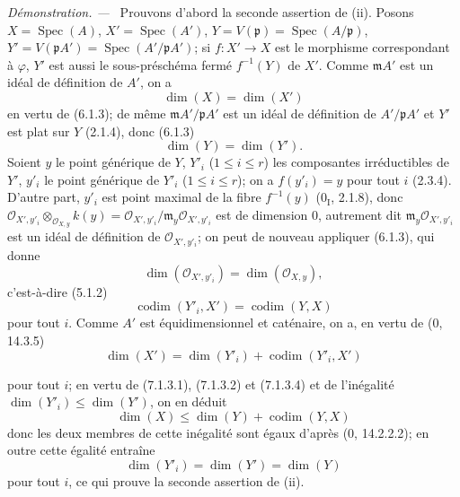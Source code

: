 \documentclass[10pt,oneside]{book}
\newcommand{\oldpage}[2][]{%
  \setcounter{footnote}{0}%
  \marginpar{\scriptsize\textbf{#1}~|~#2}\ignorespaces}
\newenvironment{proof}{%
  \par\medskip\noindent\textit{Démonstration. ---\ }}{\par}
\begin{document}
\begin{proof}
Prouvons d'abord la seconde assertion de (ii). Posons
$X=\operatorname{Spec}(A)$, $X'=\operatorname{Spec}(A')$,
$Y=V(\mathfrak p)=\operatorname{Spec}(A/\mathfrak p)$,
$Y'=V(\mathfrak pA')=\operatorname{Spec}(A'/\mathfrak pA')$; si
$f:X'\to X$ est le morphisme correspondant à $\varphi$, $Y'$ est aussi le
sous-préschéma fermé $f^{-1}(Y)$ de $X'$. Comme $\mathfrak mA'$ est un idéal
de définition de $A'$, on a
\begin{equation}
\dim(X)=\dim(X')
\tag{7.1.3.1}
\label{IV.2.eq.7.1.3.1-fr}
\end{equation}
en vertu de (6.1.3); de même $\mathfrak mA'/\mathfrak pA'$ est un idéal de
définition de $A'/\mathfrak pA'$ et $Y'$ est plat sur $Y$ (2.1.4), donc
(6.1.3)
\begin{equation}
\dim(Y)=\dim(Y').
\tag{7.1.3.2}
\label{IV.2.eq.7.1.3.2-fr}
\end{equation}
Soient $y$ le point générique de $Y$, $Y'_i$ ($1\leqslant i\leqslant r$) les
composantes irréductibles de $Y'$, $y'_i$ le point générique de $Y'_i$
($1\leqslant i\leqslant r$); on a $f(y'_i)=y$ pour tout $i$ (2.3.4).
D'autre part, $y'_i$ est point maximal de la fibre $f^{-1}(y)$ (0$_{\mathrm
I}$, 2.1.8), donc
$\mathscr O_{X',y'_i}\otimes_{\mathscr O_{X,y}}k(y)=
\mathscr O_{X',y'_i}/\mathfrak m_y\mathscr O_{X',y'_i}$ est de dimension
0, autrement dit $\mathfrak m_y\mathscr O_{X',y'_i}$ est un idéal de
définition de $\mathscr O_{X',y'_i}$; on peut de nouveau appliquer (6.1.3),
qui donne
\begin{equation}
\dim(\mathscr O_{X',y'_i})=\dim(\mathscr O_{X,y}),
\tag{7.1.3.3}
\label{IV.2.eq.7.1.3.3-fr}
\end{equation}
c'est-à-dire (5.1.2)
\begin{equation}
\operatorname{codim}(Y'_i,X')=\operatorname{codim}(Y,X)
\tag{7.1.3.4}
\label{IV.2.eq.7.1.3.4-fr}
\end{equation}
pour tout $i$. Comme $A'$ est équidimensionnel et caténaire, on a, en vertu
de (0, 14.3.5)
\begin{equation}
\dim(X')=\dim(Y'_i)+\operatorname{codim}(Y'_i,X')
\tag{7.1.3.5}
\label{IV.2.eq.7.1.3.5-fr}
\end{equation}

\oldpage[IV-2]{184}
pour tout $i$; en vertu de (7.1.3.1), (7.1.3.2) et (7.1.3.4) et de
l'inégalité $\dim(Y'_i)\leqslant\dim(Y')$, on en déduit
\begin{equation}
\dim(X)\leqslant\dim(Y)+\operatorname{codim}(Y,X)
\tag{7.1.3.6}
\label{IV.2.eq.7.1.3.6-fr}
\end{equation}
donc les deux membres de cette inégalité sont égaux d'après (0, 14.2.2.2);
en outre cette égalité entraîne
\begin{equation}
\dim(Y'_i)=\dim(Y')=\dim(Y)
\tag{7.1.3.7}
\label{IV.2.eq.7.1.3.7-fr}
\end{equation}
pour tout $i$, ce qui prouve la seconde assertion de (ii).


\end{proof}
\end{document}
